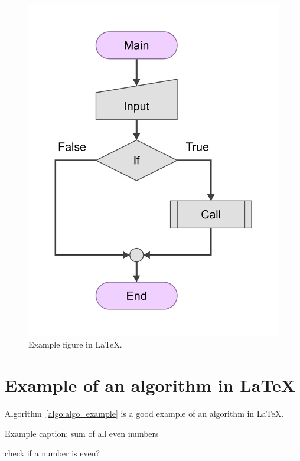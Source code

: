 \begin{itemize}
\begin{figure}[ht]
    \centering
    \includegraphics[scale=0.3]{figures/chart.pdf}
    \caption{Example figure in \LaTeX.}
    \label{fig:chart_a}
\end{figure}

\clearpage %

\section{Example of an algorithm in \LaTeX}
Algorithm~\ref{algo:algo_example} is a good example of an algorithm in \LaTeX.  
\begin{algorithm}
    \caption{Example caption: sum of all even numbers}
    \label{algo:algo_example}
    \begin{algorithmic}[1]
        \Statex
          \Comment check if a number is even?
        \EndIf
        \EndFor
        \State {}
        \EndFunction
    \end{algorithmic}
\end{algorithm}
 

\end{itemize}
